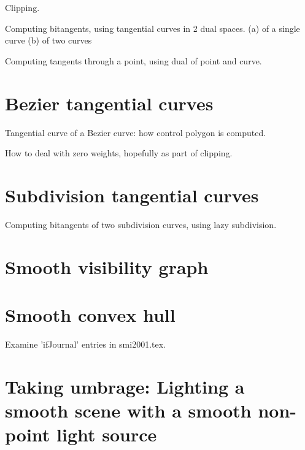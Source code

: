 \documentclass[12pt]{article}
\begin{document}
Clipping.

\begin{algorithm}
Computing bitangents, using tangential curves in 2 dual spaces.
(a) of a single curve
(b) of two curves
\end{algorithm}

\begin{algorithm}
Computing tangents through a point, using dual of point and curve.
\end{algorithm}

\section{Bezier tangential curves}

\begin{theorem}
Tangential curve of a Bezier curve: how control polygon is computed.
\end{theorem}

How to deal with zero weights, hopefully as part of clipping.

\section{Subdivision tangential curves}

\begin{algorithm}
Computing bitangents of two subdivision curves, using lazy subdivision.
\end{algorithm}

\clearpage

\section{Smooth visibility graph}

\section{Smooth convex hull}


\clearpage

Examine 'ifJournal' entries in smi2001.tex.


\clearpage
	   
\section{Taking umbrage: Lighting a smooth scene with a smooth non-point light source}
\end{document}
